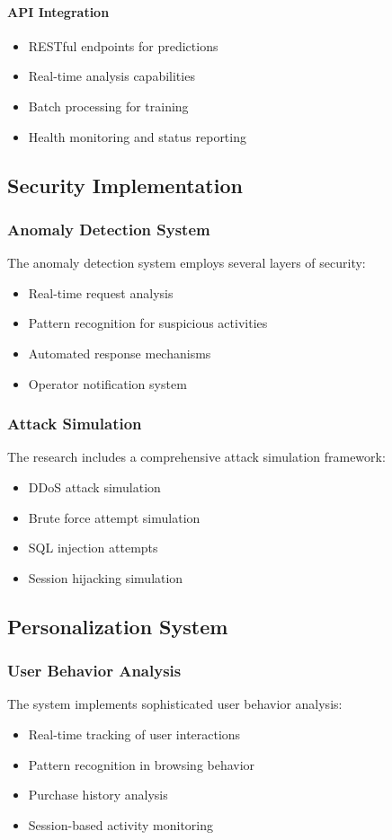 \documentclass[12pt]{article}
\begin{document}
\paragraph{API Integration}
\begin{itemize}
    \item RESTful endpoints for predictions
    \item Real-time analysis capabilities
    \item Batch processing for training
    \item Health monitoring and status reporting
\end{itemize}

\subsection{Security Implementation}
\subsubsection{Anomaly Detection System}
The anomaly detection system employs several layers of security:
\begin{itemize}
    \item Real-time request analysis
    \item Pattern recognition for suspicious activities
    \item Automated response mechanisms
    \item Operator notification system
\end{itemize}

\subsubsection{Attack Simulation}
The research includes a comprehensive attack simulation framework:
\begin{itemize}
    \item DDoS attack simulation
    \item Brute force attempt simulation
    \item SQL injection attempts
    \item Session hijacking simulation
\end{itemize}

\subsection{Personalization System}
\subsubsection{User Behavior Analysis}
The system implements sophisticated user behavior analysis:
\begin{itemize}
    \item Real-time tracking of user interactions
    \item Pattern recognition in browsing behavior
    \item Purchase history analysis
    \item Session-based activity monitoring
\end{itemize}
\end{document}
